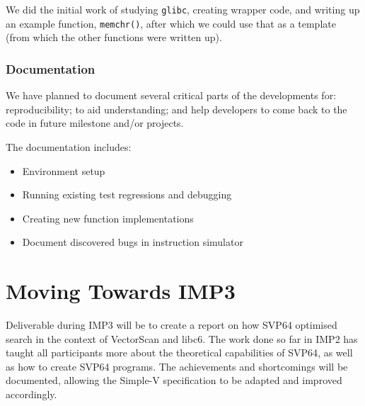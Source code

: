 We did the initial work of studying \texttt{glibc},
creating wrapper code, and writing up an example function, \texttt{memchr()},
after which we could use that as a template (from which the other functions were
written up).

\subsubsection{Documentation}

We have planned to document several critical parts of the developments for:
reproducibility; to aid understanding; and help developers to come back to
the code in future milestone and/or projects.
\par

The documentation includes:

\begin{itemize}
  \item Environment setup
  \item Running existing test regressions and debugging
  \item Creating new function implementations
  \item Document discovered bugs in instruction simulator
\end{itemize}

\section{Moving Towards IMP3}

Deliverable during \acrshort{IMP}3 will be to create a report on how \acrshort{SVP64} optimised
search in the context of VectorScan and libc6. The work done so far in \acrshort{IMP}2
has taught all participants more about the theoretical capabilities
of \acrshort{SVP64}, as well as how to create \acrshort{SVP64} programs. The achievements and
shortcomings will be documented, allowing the Simple-V specification to
be adapted and improved accordingly.
